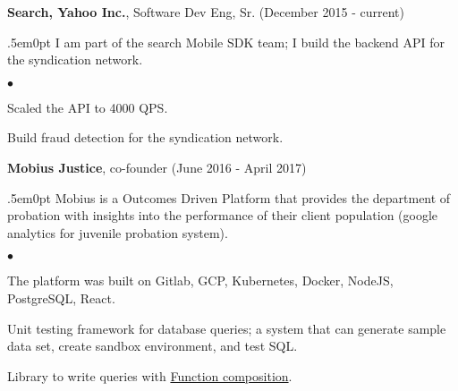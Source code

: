 \documentclass[margin, line, 10pt]{res}
\newenvironment{list2}{
  \begin{list}{$\bullet$}{%
      \setlength{\itemsep}{0in}
      \setlength{\parsep}{0in} \setlength{\parskip}{0in}
      \setlength{\topsep}{0in} \setlength{\partopsep}{0in}
      \setlength{\leftmargin}{0.2in}}}{\end{list}}
\begin{document}
\begin{resume}
{\Large {\bf Search, Yahoo Inc.}}, Software Dev Eng, Sr. (December 2015 - current)\\
\begin{adjustwidth}{.5em}{0pt}
  \vspace{-.1cm}
  I am part of the search Mobile SDK team; I build the backend API for the syndication network.
  \begin{list2}
  \vspace{.2cm}
  \item Scaled the API to 4000 QPS.
  \item Build fraud detection for the syndication network.
  \end{list2}
  \vspace{.05cm}

\end{adjustwidth}
\vspace{.05cm}

{\Large {\bf Mobius Justice}}, co-founder (June 2016 - April 2017)\\
\begin{adjustwidth}{.5em}{0pt}
  \vspace{-.1cm}
  Mobius is a Outcomes Driven Platform that provides the department of probation with
  insights into the performance of their client population (google analytics for juvenile probation system).

  \begin{list2}
  \vspace{.2cm}
  \item The platform was built on Gitlab, GCP, Kubernetes, Docker, NodeJS, PostgreSQL, React.
  \item Unit testing framework for database queries; a system that can generate sample data set, create sandbox environment, and test SQL.
  \item Library to write queries with \href{https://en.wikipedia.org/wiki/Function_composition_(computer_science)}{Function composition}.
  \end{list2}
  \vspace{.05cm}

\end{adjustwidth}
\vspace{.05cm}


\end{resume}
\end{document}
